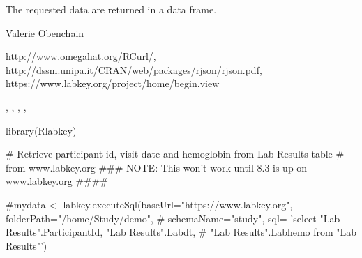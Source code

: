 \documentclass{article}
\begin{document}
\begin{Value}
The requested data are returned in a data frame.
\end{Value}
\begin{Author}\relax
Valerie Obenchain
\end{Author}
\begin{References}\relax
http://www.omegahat.org/RCurl/,\\ 
http://dssm.unipa.it/CRAN/web/packages/rjson/rjson.pdf,\\
https://www.labkey.org/project/home/begin.view
\end{References}
\begin{SeeAlso}\relax
{}, , , 
, 
\end{SeeAlso}
\begin{Examples}
\begin{ExampleCode}

library(Rlabkey)

# Retrieve participant id, visit date and hemoglobin from Lab Results table
# from www.labkey.org
### NOTE: This won't work until 8.3 is up on www.labkey.org ####

#mydata <- labkey.executeSql(baseUrl="https://www.labkey.org", folderPath="/home/Study/demo", 
# schemaName="study", sql= 'select "Lab Results".ParticipantId, "Lab Results".Labdt, 
# "Lab Results".Labhemo from "Lab Results"')

\end{ExampleCode}
\end{Examples}
\end{document}

